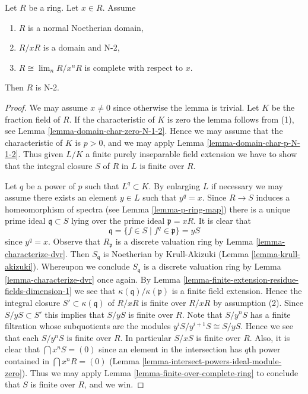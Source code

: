 \begin{lemma}[Tate]
\label{lemma-tate-japanese}
\begin{reference}
\cite[Theorem 23.1.3]{EGA}
\end{reference}
Let $R$ be a ring.
Let $x \in R$.
Assume
\begin{enumerate}
\item $R$ is a normal Noetherian domain,
\item $R/xR$ is a domain and N-2,
\item $R \cong \lim_n R/x^nR$ is complete with respect to $x$.
\end{enumerate}
Then $R$ is N-2.
\end{lemma}

\begin{proof}
We may assume $x \not = 0$ since otherwise the lemma is trivial.
Let $K$ be the fraction field of $R$. If the characteristic of $K$
is zero the lemma follows from (1), see
Lemma \ref{lemma-domain-char-zero-N-1-2}. Hence we may assume
that the characteristic of $K$ is $p > 0$, and we may apply
Lemma \ref{lemma-domain-char-p-N-1-2}. Thus given $L/K$
a finite purely inseparable field extension we have to show
that the integral closure $S$ of $R$ in $L$ is finite over $R$.

\medskip\noindent
Let $q$ be a power of $p$ such that $L^q \subset K$.
By enlarging $L$ if necessary we may assume there exists
an element $y \in L$ such that $y^q = x$. Since $R \to S$
induces a homeomorphism of spectra (see Lemma \ref{lemma-p-ring-map})
there is a unique prime ideal $\mathfrak q \subset S$ lying
over the prime ideal $\mathfrak p = xR$. It is clear that
$$
\mathfrak q = \{f \in S \mid f^q \in \mathfrak p\} = yS
$$
since $y^q = x$. Observe that $R_{\mathfrak p}$ is a discrete
valuation ring by Lemma \ref{lemma-characterize-dvr}. Then
$S_{\mathfrak q}$ is Noetherian by Krull-Akizuki
(Lemma \ref{lemma-krull-akizuki}). Whereupon we conclude
$S_{\mathfrak q}$ is a discrete valuation ring by
Lemma \ref{lemma-characterize-dvr} once again.
By Lemma \ref{lemma-finite-extension-residue-fields-dimension-1} we
see that $\kappa(\mathfrak q)/\kappa(\mathfrak p)$ is
a finite field extension. Hence the integral closure
$S' \subset \kappa(\mathfrak q)$ of $R/xR$ is finite over
$R/xR$ by assumption (2). Since $S/yS \subset S'$ this implies
that $S/yS$ is finite over $R$. Note that $S/y^nS$ has a finite
filtration whose subquotients are the modules
$y^iS/y^{i + 1}S \cong S/yS$. Hence we see that each $S/y^nS$
is finite over $R$. In particular $S/xS$ is finite over $R$.
Also, it is clear that $\bigcap x^nS = (0)$ since an element
in the intersection has $q$th power contained in $\bigcap x^nR = (0)$
(Lemma \ref{lemma-intersect-powers-ideal-module-zero}).
Thus we may apply Lemma \ref{lemma-finite-over-complete-ring} to conclude
that $S$ is finite over $R$, and we win.
\end{proof}